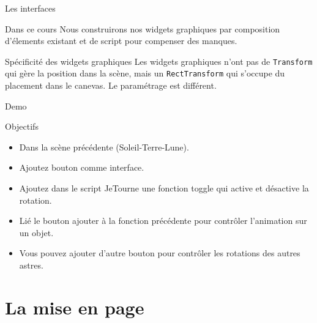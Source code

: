 \begin{frame}{Les interfaces}
	\vfill
\begin{block}{Dans ce cours}
	Nous construirons nos widgets graphiques par composition d'élements existant et de script pour compenser des manques.
\end{block}
\vfill
\begin{block}{Spécificité des widgets graphiques}
	Les widgets graphiques n'ont pas de \texttt{Transform} qui gère la position dans la scène, mais un \texttt{RectTransform} qui s'occupe du placement dans le canevas. Le paramétrage est différent.
\end{block}
\vfill


\end{frame}


\begin{frame}{Demo}
	\vfill
	\begin{block}{Objectifs}
		\begin{itemize}
			\item Dans la scène précédente (Soleil-Terre-Lune).
			\item Ajoutez bouton comme interface.
			\item Ajoutez dans le script JeTourne une fonction toggle qui active et désactive la rotation.
			\item Lié le bouton ajouter à la fonction précédente pour contrôler l'animation sur un objet.
			\item Vous pouvez ajouter d'autre bouton pour contrôler les rotations des autres astres.
		\end{itemize}
	\end{block}
	\vfill
	
\end{frame}

\section{La mise en page}


